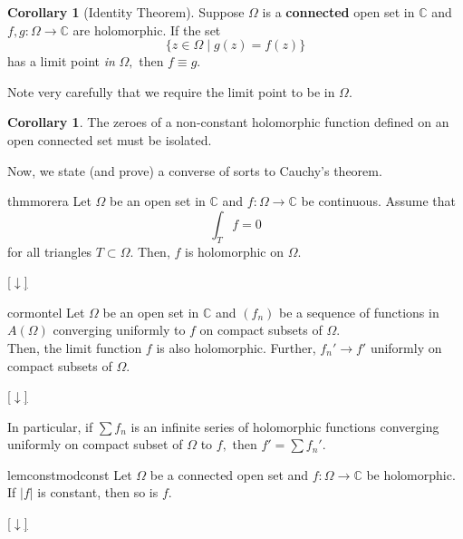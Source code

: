 \documentclass[12pt,oneside]{book}
\theoremstyle{definition}
\numberwithin{thm}{chapter}
\newtheorem{cor}[thm]{Corollary}
\newcommand{\downsym}{[$\downarrow$]}
\begin{document}
\begin{cor}[Identity Theorem]
	Suppose $\Omega$ is a \textbf{connected} open set in $\mathbb{C}$ and $f, g:\Omega \to \mathbb{C}$ are holomorphic. If the set
	\begin{equation*} 
		\{z \in \Omega \mid g(z) = f(z)\}
	\end{equation*}
	has a limit point \emph{in} $\Omega,$ then $f \equiv g.$
\end{cor}
Note very carefully that we require the limit point to be in $\Omega.$

\begin{cor}
	The zeroes of a non-constant holomorphic function defined on an open connected set must be isolated.
\end{cor}

Now, we state (and prove) a converse of sorts to Cauchy's theorem.
\begin{restatable}{thm}{morera}
\label{thm:morera}
	Let $\Omega$ be an open set in $\mathbb{C}$ and $f:\Omega \to \mathbb{C}$ be continuous. Assume that 
	\begin{equation*} 
		\int_T f = 0
	\end{equation*}
	for all triangles $T \subset \Omega.$ Then, $f$ is holomorphic on $\Omega.$
\end{restatable}
\begin{flushright}\hyperref[thm:morera2]{\downsym}\end{flushright}

\begin{restatable}{cor}{montel}
\label{cor:montel}
	Let $\Omega$ be an open set in $\mathbb{C}$ and $(f_n)$ be a sequence of functions in $A(\Omega)$ converging uniformly to $f$ on compact subsets of $\Omega.$\\
	Then, the limit function $f$ is also holomorphic. Further, $f_n' \to f'$ uniformly on compact subsets of $\Omega.$
\end{restatable}
\begin{flushright}\hyperref[cor:montel2]{\downsym}\end{flushright}
In particular, if $\sum f_n$ is an infinite series of holomorphic functions converging uniformly on compact subset of $\Omega$ to $f,$ then $f' = \sum f_n'.$

\begin{restatable}[]{lem}{constmodconst}
\label{lem:constmodconst}
	Let $\Omega$ be a connected open set and $f:\Omega\to\mathbb{C}$ be holomorphic. If $\left|f\right|$ is constant, then so is $f.$
\end{restatable}
\begin{flushright}\hyperref[lem:constmodconst2]{\downsym}\end{flushright}
\end{document}
